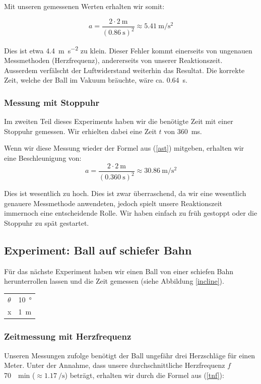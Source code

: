 \documentclass[a4paper, titlepage]{article}
\newcommand{\accunit}[1]{\SI{#1}{\metre\per\square\second}}
\begin{document}
    Mit unseren gemessenen Werten erhalten wir somit:

    \begin{equation}
        a = \frac{2 \cdot \SI{2}{\metre}}{(\SI{0.86}{\second})^2}
        \approx \accunit{5.41}
    \end{equation}

    Dies ist etwa \accunit{4.4} zu klein. Dieser Fehler kommt
    einerseits von ungenauen Messmethoden (Herzfrequenz), andererseits
    von unserer Reaktionszeit. Ausserdem verfälscht der Luftwiderstand
    weiterhin das Resultat. Die korrekte Zeit, welche der Ball
    im Vakuum bräuchte, wäre ca. \SI{0.64}{\second}.

    \subsubsection{Messung mit Stoppuhr}
    Im zweiten Teil dieses Experiments haben wir die benötigte
    Zeit mit einer Stoppuhr gemessen. Wir erhielten dabei eine
    Zeit $t$ von \SI{360}{\milli\second}.

    Wenn wir diese Messung wieder der Formel aus (\ref{ast})
    mitgeben, erhalten wir eine Beschleunigung von:
    \begin{equation}
        a = \frac{2 \cdot \SI{2}{\metre}}{(\SI{0.360}{\second})^2}
        \approx \accunit{30.86}
    \end{equation}
    
    Dies ist wesentlich zu hoch. Dies ist zwar überraschend, 
    da wir eine wesentlich genauere Messmethode anwendeten,
    jedoch spielt unsere Reaktionszeit immernoch eine entscheidende
    Rolle. Wir haben einfach zu früh gestoppt oder die Stoppuhr
    zu spät gestartet.

    \subsection{Experiment: Ball auf schiefer Bahn}
    Für das nächste Experiment haben wir einen Ball von einer 
    schiefen Bahn herunterrollen lassen und die Zeit gemessen
    (siehe Abbildung \ref{incline}).

    \begin{tabular}{|l|l|}
        \hline
        $\theta$ & \SI{10}{\degree} \\
        x & \SI{1}{\metre} \\
        \hline
    \end{tabular}

    \subsubsection{Zeitmessung mit Herzfrequenz}
    Unseren Messungen zufolge benötigt der Ball ungefähr drei Herzschläge
    für einen Meter. Unter der Annahme, dass unsere durchschnittliche
    Herzfrequenz $f$ \SI{70}{\per\minute} ($\approx \SI{1.17}{\per\second}$) 
    beträgt, erhalten wir durch die Formel aus (\ref{tnf}):
\end{document}
